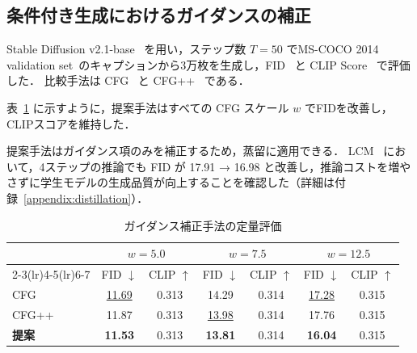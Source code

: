\documentclass[MIRU,submit]{miru2026j}
\theoremstyle{definition}
\begin{document}
\subsection{条件付き生成におけるガイダンスの補正}
\label{sec:guidance}

Stable Diffusion v2.1-base~\cite{Rombach2022} を用い，ステップ数 $T=50$ でMS-COCO 2014 validation set~\cite{Lin2014}のキャプションから3万枚を生成し，FID~\cite{Martin2017} と CLIP Score~\cite{Radford2021} で評価した．
比較手法は CFG~\cite{Ho2021} と CFG++~\cite{Chung2025} である．

表~\ref{tab:guidance_results} に示すように，提案手法はすべての CFG スケール $w$ でFIDを改善し，CLIPスコアを維持した．

提案手法はガイダンス項のみを補正するため，蒸留に適用できる．
LCM~\cite{Luo2023} において，4ステップの推論でも FID が 17.91 → 16.98 と改善し，推論コストを増やさずに学生モデルの生成品質が向上することを確認した（詳細は付録~\ref{appendix:distillation}）．

\begin{table}[t]
    \centering
    \scriptsize
    \caption{ガイダンス補正手法の定量評価}
    \label{tab:guidance_results}
    \setlength{\tabcolsep}{4.2pt}
    \begin{tabular}{l cccccc}
        \toprule
         & \multicolumn{2}{c}{$w=5.0$} & \multicolumn{2}{c}{$w=7.5$} & \multicolumn{2}{c}{$w=12.5$} \\
        \cmidrule(lr){2-3}\cmidrule(lr){4-5}\cmidrule(lr){6-7}
         & FID $\downarrow$ & CLIP $\uparrow$ & FID $\downarrow$ & CLIP $\uparrow$ & FID $\downarrow$ & CLIP $\uparrow$ \\
        \midrule
        CFG     & \underline{11.69} & 0.313 & 14.29 & 0.314 & \underline{17.28} & 0.315 \\
        CFG++   & 11.87 & 0.313 & \underline{13.98} & 0.314 & 17.76 & 0.315 \\
        \midrule
        \textbf{提案} & \textbf{11.53} & 0.313 & \textbf{13.81} & 0.314 & \textbf{16.04} & 0.315 \\
        \bottomrule
    \end{tabular}
\end{table}
\end{document}
